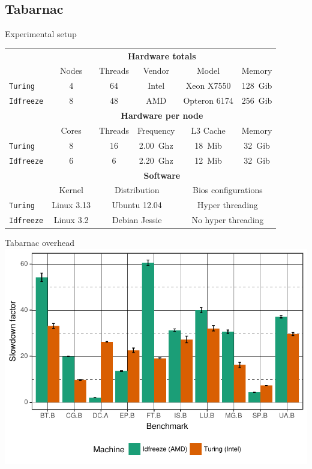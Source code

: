 \documentclass[xcolor={usenames,dvipsnames},hyperref={pdfusetitle}]{beamer}
\begin{document}
\subsection*{Tabarnac}

\begin{frame}{Experimental setup}
    \small
    \centering
    \begin{tabular}{lccccc}
        \toprule
        & \multicolumn{5}{c}{\textbf{Hardware totals}}\\
        \cmidrule(lr){2-6}
        & Nodes & Threads & Vendor & Model & Memory \\
        \cmidrule(lr){2-6}
        \texttt{Turing}   & $4$ & $64$ & Intel & Xeon X7550   & \SI{128}{Gib} \\
        \texttt{Idfreeze} & $8$ & $48$ & AMD   & Opteron 6174 & \SI{256}{Gib}\\
        \midrule
        & \multicolumn{5}{c}{\textbf{Hardware per node}}\\
        \cmidrule(lr){2-6}
        & Cores & Threads & Frequency & L3 Cache & Memory \\
        \cmidrule(lr){2-6}
        \texttt{Turing}   & $8$ & $16$ & \SI{2.00}{Ghz}& \SI{18}{Mib} & \SI{32}{Gib} \\
        \texttt{Idfreeze} & $6$ & $6$  & \SI{2.20}{Ghz}& \SI{12}{Mib} & \SI{32}{Gib}\\
        \midrule
        & \multicolumn{5}{c}{\textbf{Software}}\\
        \cmidrule(lr){2-6}
        & Kernel & \multicolumn{2}{c}{Distribution} &
        \multicolumn{2}{c}{Bios configurations} \\
        \cmidrule(lr){2-6}
        \texttt{Turing}   & Linux 3.13 & \multicolumn{2}{c}{Ubuntu 12.04} &
        \multicolumn{2}{c}{Hyper threading} \\
        \texttt{Idfreeze} & Linux 3.2 & \multicolumn{2}{c}{Debian Jessie} &
        \multicolumn{2}{c}{No hyper threading}\\
        \bottomrule
    \end{tabular}
\end{frame}

\begin{frame}{Tabarnac overhead}
    \includegraphics[width=\linewidth]{tabarnac/slides/tool-ovh.pdf}
\end{frame}
\end{document}
